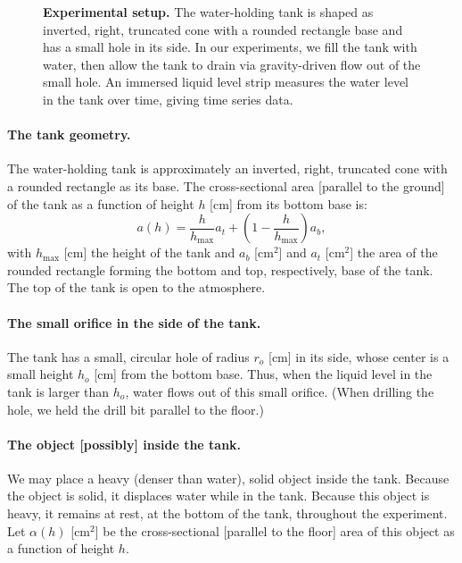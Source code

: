 \documentclass[openacc]{rsproca_new}%
\begin{document}
\begin{figure}[h!]
\begin{center}
	\caption{\textbf{Experimental setup.} 
	The water-holding tank is shaped as inverted, right, truncated cone with a rounded rectangle base and has a small hole in its side. In our experiments, we fill the tank with water, then allow the tank to drain via gravity-driven flow out of the small hole. An immersed liquid level strip measures the water level in the tank over time, giving time series data.
	}
	\label{fig:photo_of_tank}
\end{center}
\end{figure}

\paragraph{The tank geometry.} The water-holding tank is approximately an inverted, right, truncated cone with a rounded rectangle as its base. The cross-sectional area [parallel to the ground] of the tank as a function of height $h$ [cm] from its bottom base is:
\begin{equation}
	a(h) = \frac{h}{h_{\text{max}}}a_t + \left(1-\frac{h}{h_{\text{max}}}\right) a_b, \label{eq:a_of_h}
\end{equation}
with $h_{\text{max}}$ [cm] the height of the tank and $a_b$ [cm$^2$] and $a_t$ [cm$^2$] the area of the rounded rectangle forming the bottom and top, respectively, base of the tank.
The top of the tank is open to the atmosphere. 

\paragraph{The small orifice in the side of the tank.} The tank has a small, circular hole of radius $r_o$ [cm] in its side, whose center is a small height $h_o$ [cm] from the bottom base.
Thus, when the liquid level in the tank is larger than $h_o$, water flows out of this small orifice.
(When drilling the hole, we held the drill bit parallel to the floor.) 

\paragraph{The object [possibly] inside the tank.} We may place a heavy (denser than water), solid object inside the tank. Because the object is solid, it displaces water while in the tank. Because this object is heavy, it remains at rest, at the bottom of the tank, throughout the experiment. Let $\alpha(h)$ [cm$^2$] be the cross-sectional [parallel to the floor] area of this object as a function of height $h$.
\end{document}
